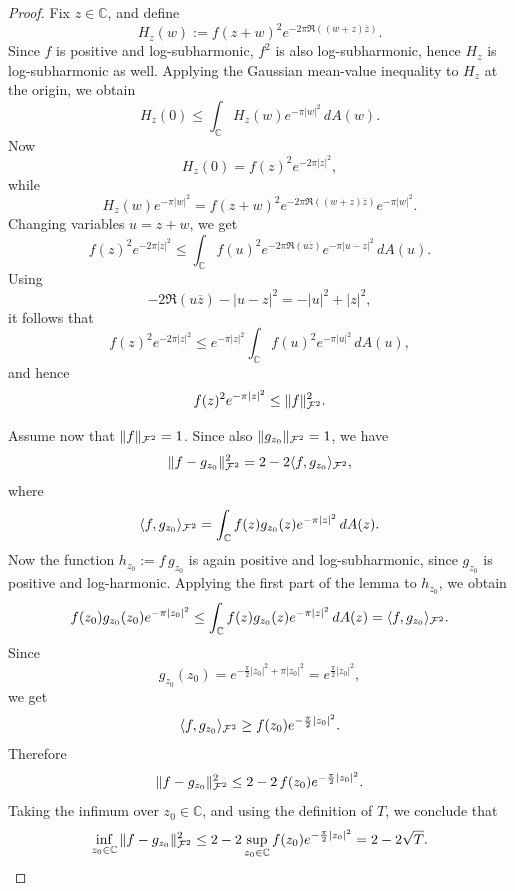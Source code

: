 \documentclass[a4paper,10pt]{amsart}
\newcommand{\Fock}{\mcalF^2}
\begin{document}
\begin{proof}
Fix \(z\in\mathbb C\), and define
\[
H_z(w):=f(z+w)^2 e^{-2\pi\Re((w+z)\overline z)}.
\]
Since \(f\) is positive and log-subharmonic, \(f^2\) is also log-subharmonic, hence
\(H_z\) is log-subharmonic as well. Applying the Gaussian mean-value inequality to \(H_z\)
at the origin, we obtain
\[
H_z(0)\le \int_{\mathbb C} H_z(w)e^{-\pi|w|^2}\,dA(w).
\]
Now
\[
H_z(0)=f(z)^2e^{-2\pi|z|^2},
\]
while
\[
H_z(w)e^{-\pi|w|^2}
=
f(z+w)^2 e^{-2\pi\Re((w+z)\overline z)}e^{-\pi|w|^2}.
\]
Changing variables \(u=z+w\), we get
\[
f(z)^2e^{-2\pi|z|^2}
\le
\int_{\mathbb C}f(u)^2 e^{-2\pi\Re(u\overline z)}e^{-\pi|u-z|^2}\,dA(u).
\]
Using
\[
-2\Re(u\overline z)-|u-z|^2=-|u|^2+|z|^2,
\]
it follows that
\[
f(z)^2e^{-2\pi|z|^2}
\le
e^{-\pi|z|^2}\int_{\mathbb C}f(u)^2e^{-\pi|u|^2}\,dA(u),
\]
and hence
\[
f(z)^2e^{-\pi|z|^2}\le \|f\|_{\Fock}^2.
\]

Assume now that \(\|f\|_{\Fock}=1\). Since also \(\|g_{z_0}\|_{\Fock}=1\), we have
\[
\|f-g_{z_0}\|_{\Fock}^2
=
2-2\langle f,g_{z_0}\rangle_{\Fock},
\]
where
\[
\langle f,g_{z_0}\rangle_{\Fock}
=
\int_{\mathbb C} f(z)g_{z_0}(z)e^{-\pi|z|^2}\,dA(z).
\]
Now the function \(h_{z_0}:=f\,g_{z_0}\) is again positive and log-subharmonic, since
\(g_{z_0}\) is positive and log-harmonic. Applying the first part of the lemma to \(h_{z_0}\),
we obtain
\[
f(z_0)g_{z_0}(z_0)e^{-\pi|z_0|^2}
\le
\int_{\mathbb C} f(z)g_{z_0}(z)e^{-\pi|z|^2}\,dA(z)
=
\langle f,g_{z_0}\rangle_{\Fock}.
\]
Since
\[
g_{z_0}(z_0)=e^{-\frac{\pi}{2}|z_0|^2+\pi|z_0|^2}
=e^{\frac{\pi}{2}|z_0|^2},
\]
we get
\[
\langle f,g_{z_0}\rangle_{\Fock}\ge f(z_0)e^{-\frac{\pi}{2}|z_0|^2}.
\]
Therefore
\[
\|f-g_{z_0}\|_{\Fock}^2
\le
2-2\,f(z_0)e^{-\frac{\pi}{2}|z_0|^2}.
\]
Taking the infimum over \(z_0\in\mathbb C\), and using the definition of \(T\), we conclude that
\[
\inf_{z_0\in\mathbb C}\|f-g_{z_0}\|_{\Fock}^2
\le
2-2\sup_{z_0\in\mathbb C} f(z_0)e^{-\frac{\pi}{2}|z_0|^2}
=
2-2\sqrt{T}.
\]
\end{proof}
\end{document}
